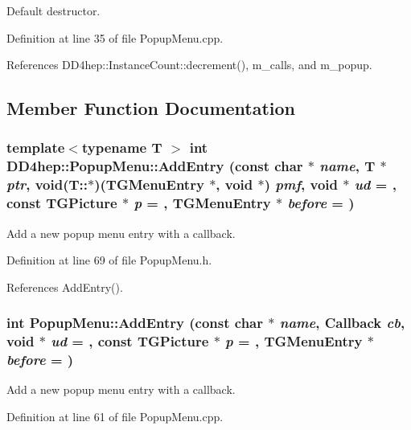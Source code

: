 Default destructor. 

Definition at line 35 of file PopupMenu.cpp.

References DD4hep::InstanceCount::decrement(), m\_\-calls, and m\_\-popup.

\subsection{Member Function Documentation}
\hypertarget{class_d_d4hep_1_1_popup_menu_a3baedc1473212377a1045b5b71345df4}{
\subsubsection[{AddEntry}]{\setlength{\rightskip}{0pt plus 5cm}template$<$typename T $>$ int DD4hep::PopupMenu::AddEntry (const char $\ast$ {\em name}, \/  {\bf T} $\ast$ {\em ptr}, \/  void(T::$\ast$)(TGMenuEntry $\ast$, void $\ast$) {\em pmf}, \/  void $\ast$ {\em ud} = {}, \/  const TGPicture $\ast$ {\em p} = {}, \/  TGMenuEntry $\ast$ {\em before} = {})}}
\label{class_d_d4hep_1_1_popup_menu_a3baedc1473212377a1045b5b71345df4}


Add a new popup menu entry with a callback. 

Definition at line 69 of file PopupMenu.h.

References AddEntry().\hypertarget{class_d_d4hep_1_1_popup_menu_a31d232887f2d18d1437836641cdf9c62}{
\subsubsection[{AddEntry}]{\setlength{\rightskip}{0pt plus 5cm}int PopupMenu::AddEntry (const char $\ast$ {\em name}, \/  {\bf Callback} {\em cb}, \/  void $\ast$ {\em ud} = {}, \/  const TGPicture $\ast$ {\em p} = {}, \/  TGMenuEntry $\ast$ {\em before} = {})}}
\label{class_d_d4hep_1_1_popup_menu_a31d232887f2d18d1437836641cdf9c62}


Add a new popup menu entry with a callback. 

Definition at line 61 of file PopupMenu.cpp.

